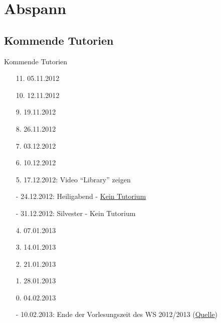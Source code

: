 \documentclass[usepdftitle=false,hyperref={pdfpagelabels=false}]{beamer}
\begin{document}
\section{Abspann}
\subsection{Kommende Tutorien}
\begin{frame}{Kommende Tutorien}
  \begin{itemize}
    \item[11.] 05.11.2012
    \item[10.] 12.11.2012
    \item[9.] 19.11.2012
    \item[8.] 26.11.2012
    \item[7.] 03.12.2012
    \item[6.] 10.12.2012
    \item[5.] 17.12.2012: Video "`Library"' zeigen
    \item[-] 24.12.2012: Heiligabend - \href{http://www.fmc.uni-karlsruhe.de/faq/wann-sind-die-weihnachtsferien}{Kein Tutorium}
    \item[-] 31.12.2012: Silvester - Kein Tutorium
    \item[4.] 07.01.2013
    \item[3.] 14.01.2013
    \item[2.] 21.01.2013
    \item[1.] 28.01.2013
    \item[0.] 04.02.2013
    \item[-] 10.02.2013: Ende der Vorlesungszeit des WS 2012/2013 (\href{http://www.kit.edu/studieren/2873.php}{Quelle})
  \end{itemize}
\end{frame}

\end{document}
